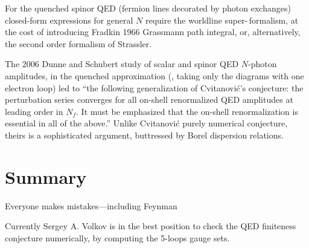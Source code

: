 For the quenched spinor QED (fermion lines decorated by photon exchanges)
closed-form expressions for general $N$ require the worldline
super-\,formalism, at the cost of introducing Fradkin
1966 Grassmann path integral,
or, alternatively,
the second order
formalism of Strassler.

The 2006 Dunne and Schubert study of scalar and spinor QED
$N$-photon amplitudes, in the quenched approximation (\ie, taking only
the diagrams with one electron loop) led to ``the following
generalization of Cvitanovi\'c's conjecture: the perturbation series
converges for all on-shell renormalized QED amplitudes at leading order
in $N_f$. It must be emphasized that the on-shell renormalization is
essential in all of the above.''
Unlike Cvitanovi\'c purely numerical conjecture, theirs is a
sophisticated argument, buttressed by Borel dispersion relations.


\section{Summary}
\label{sect:Summary}

\begin{bartlett}{
{Everyone makes mistakes—including {Feynman}}
        }
\end{bartlett}
\bigskip

\noindent
Currently Sergey  A. Volkov is in the best position to check the QED
finiteness conjecture numerically, by computing the 5-loops gauge sets.

